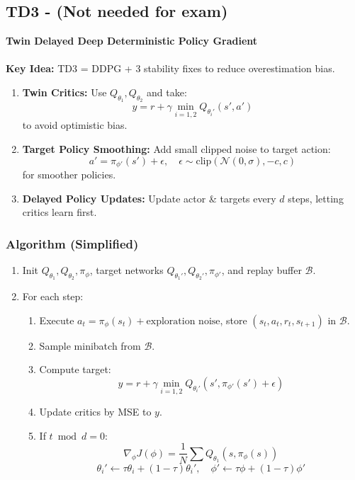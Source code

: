 \documentclass[12pt]{article}
\begin{document}
\subsection{TD3  - (Not needed for exam)}
\textbf{Twin Delayed Deep Deterministic Policy Gradient} \\ \\
\textbf{Key Idea:}
TD3 = DDPG + 3 stability fixes to reduce overestimation bias.

\begin{enumerate}
    \item \textbf{Twin Critics:} Use $Q_{\theta_1}, Q_{\theta_2}$ and take:
    \[
    y = r + \gamma \min_{i=1,2} Q_{\theta_i'}(s', a')
    \]
    to avoid optimistic bias.
    \item \textbf{Target Policy Smoothing:}  
    Add small clipped noise to target action:
    \[
    a' = \pi_{\phi'}(s') + \epsilon, \quad \epsilon \sim \mathrm{clip}(\mathcal{N}(0,\sigma), -c, c)
    \]
    for smoother policies.
    \item \textbf{Delayed Policy Updates:}  
    Update actor \& targets every $d$ steps, letting critics learn first.
\end{enumerate}

\subsubsection{Algorithm (Simplified)}
\begin{enumerate}
    \item Init $Q_{\theta_1}, Q_{\theta_2}, \pi_{\phi}$, target networks $Q_{\theta_1'}, Q_{\theta_2'}, \pi_{\phi'}$, and replay buffer $\mathcal{B}$.
    \item For each step:
    \begin{enumerate}
        \item Execute $a_t = \pi_\phi(s_t) + \text{exploration noise}$, store $(s_t, a_t, r_t, s_{t+1})$ in $\mathcal{B}$.
        \item Sample minibatch from $\mathcal{B}$.
        \item Compute target:
        \[
        y = r + \gamma \min_{i=1,2} Q_{\theta_i'}(s', \pi_{\phi'}(s') + \epsilon)
        \]
        \item Update critics by MSE to $y$.
        \item If $t \bmod d = 0$:
        \[
        \nabla_{\phi} J(\phi) = \frac{1}{N} \sum Q_{\theta_1}(s, \pi_\phi(s))
        \]
        \[
        \theta_i' \leftarrow \tau \theta_i + (1-\tau)\theta_i', \quad
        \phi' \leftarrow \tau \phi + (1-\tau)\phi'
        \]
    \end{enumerate}
\end{enumerate}
\end{document}
